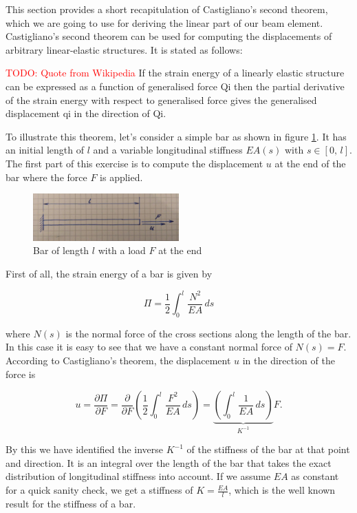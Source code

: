 This section provides a short recapitulation of Castigliano's second theorem, which we are going to use for deriving the linear part of our beam element.
Castigliano's second theorem can be used for computing the displacements of arbitrary linear-elastic structures.
It is stated as follows:

\textcolor{red}{TODO: Quote from Wikipedia}
If the strain energy of a linearly elastic structure can be expressed as a function of generalised force Qi then the partial derivative of the strain energy with respect to generalised force gives the generalised displacement qi in the direction of Qi.

To illustrate this theorem, let's consider a simple bar as shown in figure \ref{fig:castigliano-bar-1}.
It has an initial length of $l$ and a variable longitudinal stiffness $EA(s)$ with $s \in [0,\,l]$.
The first part of this exercise is to compute the displacement $u$ at the end of the bar where the force $F$ is applied.

\begin{figure}[h]
\centering
\includegraphics[width=0.5\textwidth]{figures/elements/castigliano-bar-1.jpg}
\caption{Bar of length $l$ with a load $F$ at the end}
\label{fig:castigliano-bar-1}
\end{figure}

First of all, the strain energy of a bar is given by

\begin{equation}
\Pi = \frac{1}{2}\int_{0}^{l}\frac{N^2}{EA}\,ds
\end{equation}

where $N(s)$ is the normal force of the cross sections along the length of the bar.
In this case it is easy to see that we have a constant normal force of $N(s) = F$.
According to Castigliano's theorem, the displacement $u$ in the direction of the force is

\begin{equation}
u = \frac{\partial \Pi}{\partial F} = \frac{\partial}{\partial F}\left(\frac{1}{2}\int_{0}^{l}\frac{F^2}{EA}\,ds\right) = \underbrace{\left(\int_{0}^{l}\frac{1}{EA}\,ds\right)}_{K^{-1}}F.
\end{equation}

By this we have identified the inverse $K^{-1}$ of the stiffness of the bar at that point and direction.
It is an integral over the length of the bar that takes the exact distribution of longitudinal stiffness into account.
If we assume $EA$ as constant for a quick sanity check, we get a stiffness of $K = \frac{EA}{l}$, which is the well known result for the stiffness of a bar.

